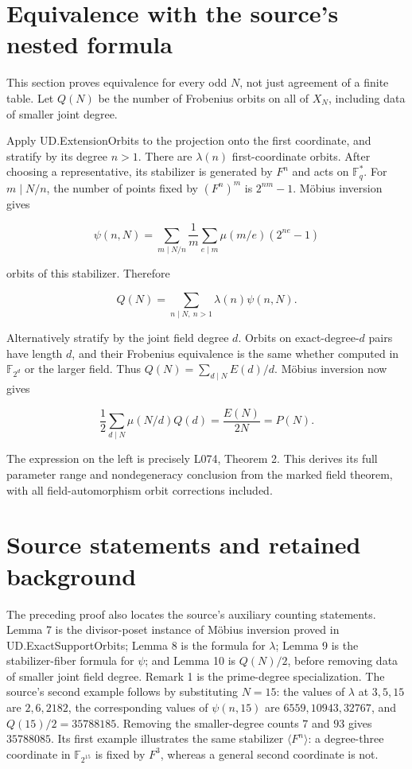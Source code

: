 \section{Equivalence with the source's nested
formula}\label{equivalence-with-the-sources-nested-formula}

This section proves equivalence for every odd \(N\), not just agreement
of a finite table. Let \(Q(N)\) be the number of Frobenius orbits on all
of \(X_N\), including data of smaller joint degree.

Apply UD.ExtensionOrbits to the projection onto the first coordinate,
and stratify by its degree \(n>1\). There are \(\lambda(n)\)
first-coordinate orbits. After choosing a representative, its stabilizer
is generated by \(F^n\) and acts on \(\mathbb F_q^*\). For
\(m\mid N/n\), the number of points fixed by \((F^n)^m\) is
\(2^{nm}-1\). Möbius inversion gives

\[\psi(n,N)=\sum_{m\mid N/n}\frac1m
       \sum_{e\mid m}\mu(m/e)(2^{ne}-1)\]

orbits of this stabilizer. Therefore

\[Q(N)=\sum_{n\mid N,\ n>1}\lambda(n)\psi(n,N).\]

Alternatively stratify by the joint field degree \(d\). Orbits on
exact-degree-\(d\) pairs have length \(d\), and their Frobenius
equivalence is the same whether computed in \(\mathbb F_{2^d}\) or the
larger field. Thus \(Q(N)=\sum_{d\mid N}E(d)/d\). Möbius inversion now
gives

\[\frac12\sum_{d\mid N}\mu(N/d)Q(d)=\frac{E(N)}{2N}=P(N).\]

The expression on the left is precisely L074, Theorem 2. This derives
its full parameter range and nondegeneracy conclusion from the marked
field theorem, with all field-automorphism orbit corrections included.

\section{Source statements and retained
background}\label{source-statements-and-retained-background}

The preceding proof also locates the source's auxiliary counting
statements. Lemma 7 is the divisor-poset instance of Möbius inversion
proved in UD.ExactSupportOrbits; Lemma 8 is the formula for \(\lambda\);
Lemma 9 is the stabilizer-fiber formula for \(\psi\); and Lemma 10 is
\(Q(N)/2\), before removing data of smaller joint field degree. Remark 1
is the prime-degree specialization. The source's second example follows
by substituting \(N=15\): the values of \(\lambda\) at \(3,5,15\) are
\(2,6,2182\), the corresponding values of \(\psi(n,15)\) are
\(6559,10943,32767\), and \(Q(15)/2=35788185\). Removing the
smaller-degree counts \(7\) and \(93\) gives \(35788085\). Its first
example illustrates the same stabilizer \(\langle F^n\rangle\): a
degree-three coordinate in \(\mathbb F_{2^{15}}\) is fixed by \(F^3\),
whereas a general second coordinate is not.

